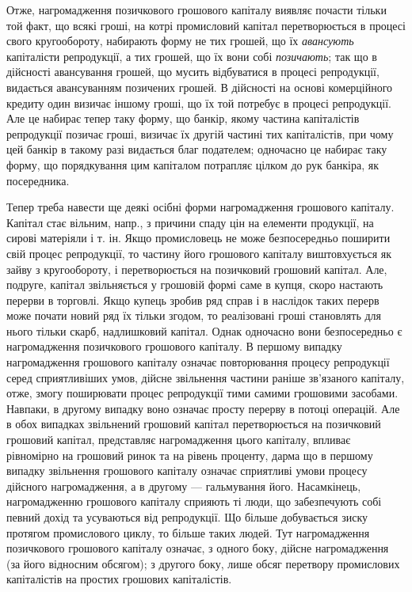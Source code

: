 
Отже, нагромадження позичкового грошового капіталу виявляє почасти
тільки той факт, що всякі гроші, на котрі промисловий капітал перетворюється
в процесі свого кругообороту, набирають форму не тих грошей, що їх
\emph{авансують} капіталісти репродукції, а тих грошей, що їх вони собі \emph{позичають};
так що в дійсності авансування грошей, що мусить відбуватися в процесі
репродукції, видається авансуванням позичених грошей. В дійсності на
основі комерційного кредиту один визичає іншому гроші, що їх той потребує
в процесі репродукції. Але це набирає тепер таку форму, що банкір, якому
частина капіталістів репродукції позичає гроші, визичає їх другій частині
тих капіталістів, при чому цей банкір в такому разі видається благ подателем;
одночасно це набирає таку форму, що порядкування цим капіталом потрапляє
цілком до рук банкіра, як посередника.

Тепер треба навести ще деякі осібні форми нагромадження грошового
капіталу. Капітал стає вільним, напр., з причини спаду цін на елементи продукції,
на сирові матеріяли і т. ін. Якщо промисловець не може безпосередньо поширити
свій процес репродукції, то частину його грошового капіталу виштовхується
як зайву з кругообороту, і перетворюється на позичковий грошовий капітал.
Але, подруге, капітал звільняється у грошовій формі саме в купця, скоро
настають перерви в торговлі. Якщо купець зробив ряд справ і в наслідок таких
перерв може почати новий ряд їх тільки згодом, то реалізовані гроші становлять
для нього тільки скарб, надлишковий капітал. Однак одночасно вони безпосередньо
є нагромадження позичкового грошового капіталу. В першому випадку нагромадження
грошового капіталу означає повторювання процесу репродукції серед
сприятливіших умов, дійсне звільнення частини раніше зв’язаного капіталу,
отже, змогу поширювати процес репродукції тими самими грошовими засобами.
Навпаки, в другому випадку воно означає просту перерву в потоці операцій.
Але в обох випадках звільнений грошовий капітал перетворюється на позичковий
грошовий капітал, представляє нагромадження цього капіталу, впливає рівномірно
на грошовий ринок та на рівень проценту, дарма що в першому випадку
звільнення грошового капіталу означає сприятливі умови процесу дійсного нагромадження,
а в другому — гальмування його. Насамкінець, нагромадженню грошового
капіталу сприяють ті люди, що забезпечують собі певний дохід та усуваються від
репродукції. Що більше добувається зиску протягом промислового циклу, то більше
таких людей. Тут нагромадження позичкового грошового капіталу означає, з одного
боку, дійсне нагромадження (за його відносним обсягом); з другого боку,
лише обсяг перетвору промислових капіталістів на простих грошових капіталістів.

